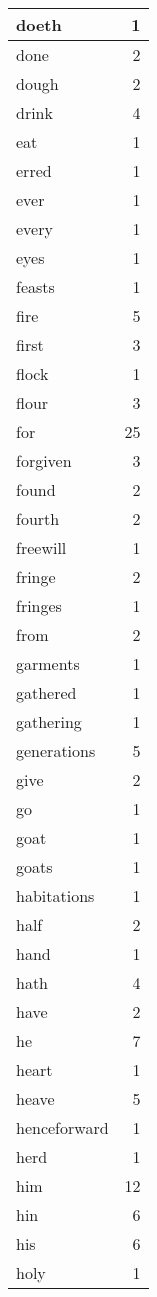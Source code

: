 \begin{center}
\begin{longtable}{l|r}
doeth & 1 \\ \hline
done & 2 \\ \hline
dough & 2 \\ \hline
drink & 4 \\ \hline
eat & 1 \\ \hline
erred & 1 \\ \hline
ever & 1 \\ \hline
every & 1 \\ \hline
eyes & 1 \\ \hline
feasts & 1 \\ \hline
fire & 5 \\ \hline
first & 3 \\ \hline
flock & 1 \\ \hline
flour & 3 \\ \hline
for & 25 \\ \hline
forgiven & 3 \\ \hline
found & 2 \\ \hline
fourth & 2 \\ \hline
freewill & 1 \\ \hline
fringe & 2 \\ \hline
fringes & 1 \\ \hline
from & 2 \\ \hline
garments & 1 \\ \hline
gathered & 1 \\ \hline
gathering & 1 \\ \hline
generations & 5 \\ \hline
give & 2 \\ \hline
go & 1 \\ \hline
goat & 1 \\ \hline
goats & 1 \\ \hline
habitations & 1 \\ \hline
half & 2 \\ \hline
hand & 1 \\ \hline
hath & 4 \\ \hline
have & 2 \\ \hline
he & 7 \\ \hline
heart & 1 \\ \hline
heave & 5 \\ \hline
henceforward & 1 \\ \hline
herd & 1 \\ \hline
him & 12 \\ \hline
hin & 6 \\ \hline
his & 6 \\ \hline
holy & 1 \\ \hline

\end{longtable}
\end{center}
